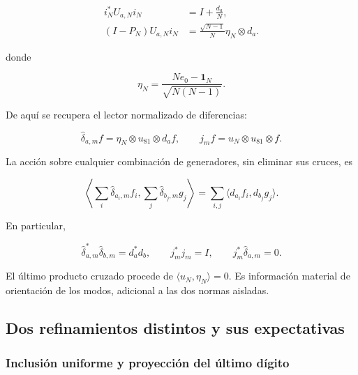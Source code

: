 \begin{equation}
\begin{aligned}
i_N^*U_{a,N}i_N&=I+\frac{d_a}{N},\\
(I-P_N)U_{a,N}i_N
&=\frac{\sqrt{N-1}}{N}\eta_N\otimes d_a.
\end{aligned}
\label{gamma-add-display-3}
\end{equation}

donde

\begin{equation}
\eta_N=\frac{Ne_0-\mathbf1_N}{\sqrt{N(N-1)}}.
\label{gamma-add-display-4}
\end{equation}

De aquí se recupera el lector normalizado de diferencias:

\begin{equation}
\widehat\delta_{a,m}f=\eta_N\otimes u_{81}\otimes d_af,
\qquad
j_mf=u_N\otimes u_{81}\otimes f.
\label{gamma-add-display-5}
\end{equation}

La acción sobre cualquier combinación de generadores, sin eliminar sus cruces, es

\begin{equation}
\left\langle\sum_i\widehat\delta_{a_i,m}f_i,
                  \sum_j\widehat\delta_{b_j,m}g_j\right\rangle
=\sum_{i,j}\langle d_{a_i}f_i,d_{b_j}g_j\rangle.
\label{gamma-add-display-6}
\end{equation}

En particular,

\begin{equation}
\widehat\delta_{a,m}^*\widehat\delta_{b,m}=d_a^*d_b,\qquad
j_m^*j_m=I,\qquad
j_m^*\widehat\delta_{a,m}=0.
\label{gamma-add-eq-1}
\end{equation}

El último producto cruzado procede de \(\langle u_N,\eta_N\rangle=0\). Es información material de orientación de los modos, adicional a las dos normas aisladas.

\subsection{Dos refinamientos distintos y sus expectativas}
\label{gamma-add-sub-108}

\subsubsection{Inclusión uniforme y proyección del último dígito}
\label{gamma-add-sub-110}

